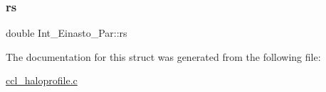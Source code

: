 \mbox{\label{struct_int___einasto___par_ae65e5b7551a2fd6aaae65d2bf268250d}} 
\subsubsection{\texorpdfstring{rs}{rs}}
{\footnotesize\ttfamily double Int\+\_\+\+Einasto\+\_\+\+Par\+::rs}



The documentation for this struct was generated from the following file\+:\begin{DoxyCompactItemize}
\item 
\mbox{\hyperlink{ccl__haloprofile_8c}{ccl\+\_\+haloprofile.\+c}}\end{DoxyCompactItemize}
